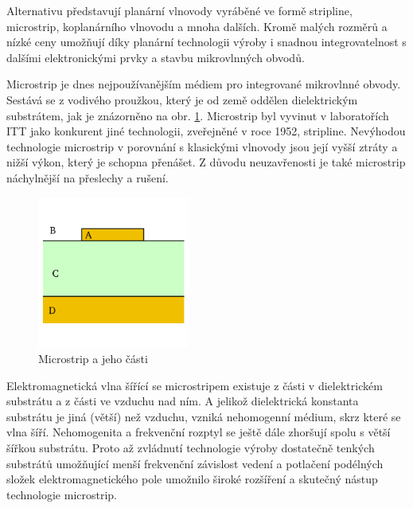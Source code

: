 \documentclass[12pt,a4paper,oneside]{article}
\numberwithin{equation}{section} %
\numberwithin{figure}{section} %
\numberwithin{table}{section} %
\renewcommand{\vec}[1]{\mbox{\boldmath$#1$}} %
\begin{document}
Alternativu představují planární vlnovody vyráběné ve formě stripline, microstrip, koplanárního vlnovodu a mnoha dalších. Kromě malých rozměrů a nízké ceny umožňují díky planární technologii výroby i snadnou integrovatelnost s dalšími elektronickými prvky a stavbu mikrovlnných obvodů.

Microstrip je dnes nejpoužívanějším médiem pro integrované mikrovlnné obvody. Sestává se z vodivého proužkou, který je od země oddělen dielektrickým substrátem, jak je znázorněno na obr. \ref{microstrip}. Microstrip byl vyvinut v laboratořích ITT jako konkurent jiné technologii, zveřejněné v roce 1952, stripline. Nevýhodou technologie microstrip v porovnání s klasickými vlnovody jsou její vyšší ztráty a nižší výkon, který je schopna přenášet. Z důvodu neuzavřenosti je také microstrip náchylnější na přeslechy a rušení.

\begin{figure}[h] 
\begin{center}
\includegraphics[width=5cm]{microstrip.png}
\caption{Microstrip a jeho části}
\label{microstrip}
\end{center}
\end{figure}

Elektromagnetická vlna šířící se microstripem existuje z části v dielektrickém substrátu a z části ve vzduchu nad ním. A jelikož dielektrická konstanta substrátu je jiná (větší) než vzduchu, vzniká nehomogenní médium, skrz které se vlna šíří. Nehomogenita a frekvenční rozptyl se ještě dále zhoršují spolu s větší šířkou substrátu. Proto až zvládnutí technologie výroby dostatečně tenkých substrátů umožňující menší frekvenční závislost vedení a potlačení podélných složek elektromagnetického pole umožnilo široké rozšíření a skutečný nástup technologie microstrip. \cite{Microstrip}
\end{document}
